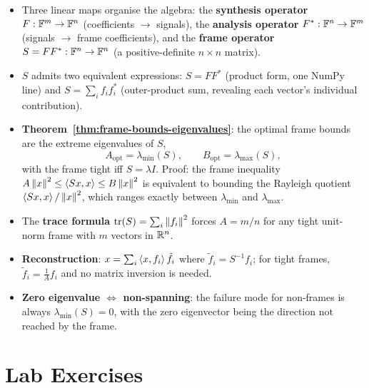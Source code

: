 \begin{itemize}
  \item Three linear maps organise the algebra: the \textbf{synthesis
        operator} $F:\mathbb{F}^m\to\mathbb{F}^n$ (coefficients $\to$ signals), the
        \textbf{analysis operator} $F^*:\mathbb{F}^n\to\mathbb{F}^m$ (signals $\to$
        frame coefficients), and the \textbf{frame operator}
        $S=FF^*:\mathbb{F}^n\to\mathbb{F}^n$ (a positive-definite $n\times n$ matrix).
  \item $S$ admits two equivalent expressions: $S=FF^*$ (product form,
        one NumPy line) and $S=\sum_i f_if_i^*$ (outer-product sum,
        revealing each vector's individual contribution).
  \item \textbf{Theorem~\ref{thm:frame-bounds-eigenvalues}}: the optimal
        frame bounds are the extreme eigenvalues of $S$,
        \[
          A_{\mathrm{opt}}=\lambda_{\min}(S),\qquad
          B_{\mathrm{opt}}=\lambda_{\max}(S),
        \]
        with the frame tight iff $S=\lambda I$.
        Proof: the frame inequality $A\left\| x \right\|^2\le\left\langle Sx, x \right\rangle\le
        B\left\| x \right\|^2$ is equivalent to bounding the Rayleigh quotient
        $\left\langle Sx, x \right\rangle/\left\| x \right\|^2$, which ranges exactly between
        $\lambda_{\min}$ and $\lambda_{\max}$.
  \item The \textbf{trace formula} $\operatorname{tr}(S)=\sum_i\left\| f_i \right\|^2$ forces
        $A=m/n$ for any tight unit-norm frame with $m$ vectors in $\mathbb{R}^n$.
  \item \textbf{Reconstruction}: $x=\sum_i\left\langle x, f_i \right\rangle\tilde f_i$
        where $\tilde f_i=S^{-1}f_i$; for tight frames, $\tilde
        f_i=\tfrac1A f_i$ and no matrix inversion is needed.
  \item \textbf{Zero eigenvalue $\Leftrightarrow$ non-spanning}: the
        failure mode for non-frames is always $\lambda_{\min}(S)=0$, with
        the zero eigenvector being the direction not reached by the frame.
\end{itemize}

\section{Lab Exercises}
\label{sec:lab-ch3}

